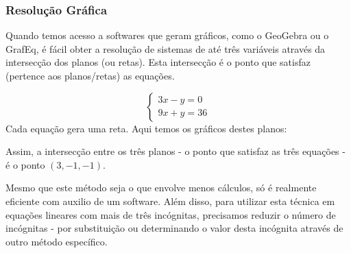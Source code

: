 \subsubsection{Resolução Gráfica}
Quando temos acesso a softwares que geram gráficos, como o GeoGebra ou o GrafEq, é fácil obter a resolução de sistemas de até três variáveis através da intersecção dos planos (ou retas). Esta intersecção é o ponto que satisfaz (pertence aos planos/retas) as equações.
\begin{exemplo}
\[\begin{cases}
3x-y=0 \\
9x+y=36
\end{cases}\]
Cada equação gera uma reta. Aqui temos os gráficos destes planos:  

\begin{figure}[H]
\begin{center}
\end{center}
\end{figure}

Assim, a intersecção entre os três planos - o ponto que satisfaz as três equações - é o ponto $(3,-1,-1)$.
\end{exemplo}
Mesmo que este método seja o que envolve menos cálculos, só é realmente eficiente com auxilio de um software. Além disso, para utilizar esta técnica em equações lineares com mais de três incógnitas, precisamos reduzir o número de incógnitas - por substituição ou determinando o valor desta incógnita através de outro método específico.


